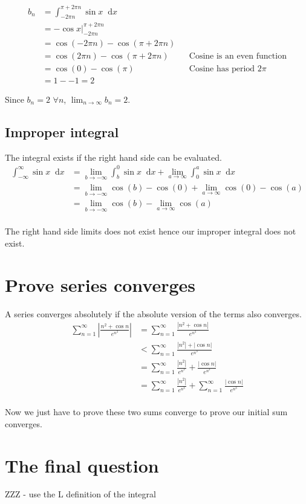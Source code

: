 \documentclass{article}
\newcommand{\diff}{\mathop{}\!\mathrm{d}}
\begin{document}
\begin{align*}
    b_n &= \int_{-2\pi n}^{\pi + 2\pi n} \sin x \diff x \\
    &= -\cos x \Big|_{-2\pi n}^{\pi + 2\pi n} \\
    &= \cos (-2\pi n) - \cos (\pi + 2\pi n) \\
    &= \cos (2\pi n) - \cos (\pi + 2\pi n)
    && \text{Cosine is an even function} \\
    &= \cos (0) - \cos (\pi)
    && \text{Cosine has period $2\pi$} \\
    &= 1 - -1 = 2
\end{align*}

Since $b_n = 2$ $\forall n$, $\lim_{n \to \infty} b_n = 2$.

\subsection{Improper integral}
The integral exists if the right hand side can be evaluated.
\begin{align*}
    \int_{-\infty}^{\infty} \sin x \diff x
    &= \lim_{b \to -\infty} \int_{b}^{0} \sin x \diff x
    + \lim_{a \to \infty} \int_{0}^{a} \sin x \diff x \\
    &= \lim_{b \to -\infty} \cos (b) - \cos (0)
    + \lim_{a \to \infty} \cos (0) - \cos (a) \\
    &= \lim_{b \to -\infty} \cos (b) - \lim_{a \to \infty} \cos (a) \\
\end{align*}

The right hand side limits does not exist hence our improper integral
does not exist.

\section{Prove series converges}
A series converges absolutely if the absolute version of the terms also
converges.
\begin{align*}
    \sum_{n=1}^\infty \left| \frac{n^2 + \cos n}{e^{n^3}} \right|
    &= \sum_{n=1}^\infty \frac{\left| n^2 + \cos n \right|}{e^{n^3}} \\
    &< \sum_{n=1}^\infty \frac{\left| n^2 \right| + \left| \cos n \right|}
    {e^{n^3}} \\
    &= \sum_{n=1}^\infty \frac{\left| n^2 \right|}{e^{n^3}}
    + \frac{\left| \cos n \right|}{e^{n^3}} \\
    &= \sum_{n=1}^\infty \frac{\left| n^2 \right|}{e^{n^3}}
    + \sum_{n=1}^\infty \frac{\left| \cos n \right|}{e^{n^3}} \\
\end{align*}

Now we just have to prove these two sums converge to prove our initial sum
converges. 

\section{The final question}

ZZZ - use the L definition of the integral
\end{document}
